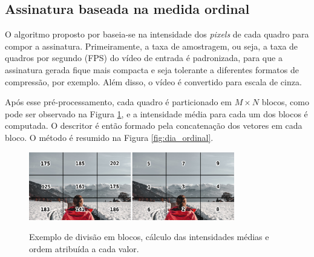 %
%
\subsection{Assinatura baseada na medida ordinal}
\label{sec:med_ordinal}

	O algoritmo proposto por  baseia-se na intensidade dos \textit{pixels} de cada quadro para compor a assinatura. Primeiramente, a taxa de amostragem, ou seja, a taxa de quadros por segundo (FPS) do vídeo de entrada é padronizada, para que a assinatura gerada fique mais compacta e seja tolerante a diferentes formatos de compressão, por exemplo. Além disso, o vídeo é convertido para escala de cinza.

	Após esse pré-processamento, cada quadro é particionado em $M \times N$ blocos, como pode ser observado na Figura \ref{fig:medidaord}, e a intensidade média para cada um dos blocos é computada. O descritor é então formado pela concatenação dos vetores em cada bloco. O método é resumido na Figura \ref{fig:dia_ordinal}.
    

	\begin{figure}[!htb]
        \centering
        \caption{Exemplo de divisão em blocos, cálculo das intensidades médias e ordem atribuída a cada valor.}
        \includegraphics[width=0.8\textwidth]{dados/figuras/mo_final.png}
        \label{fig:medidaord}
    \end{figure}

